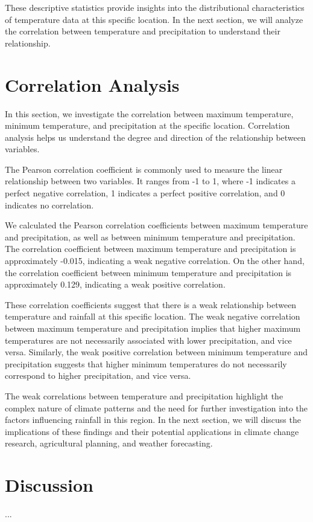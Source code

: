 \documentclass{article}
\begin{document}
These descriptive statistics provide insights into the distributional characteristics of temperature data at this specific location. In the next section, we will analyze the correlation between temperature and precipitation to understand their relationship.

\section{Correlation Analysis}
In this section, we investigate the correlation between maximum temperature, minimum temperature, and precipitation at the specific location. Correlation analysis helps us understand the degree and direction of the relationship between variables.

The Pearson correlation coefficient is commonly used to measure the linear relationship between two variables. It ranges from -1 to 1, where -1 indicates a perfect negative correlation, 1 indicates a perfect positive correlation, and 0 indicates no correlation.

We calculated the Pearson correlation coefficients between maximum temperature and precipitation, as well as between minimum temperature and precipitation. The correlation coefficient between maximum temperature and precipitation is approximately -0.015, indicating a weak negative correlation. On the other hand, the correlation coefficient between minimum temperature and precipitation is approximately 0.129, indicating a weak positive correlation.

These correlation coefficients suggest that there is a weak relationship between temperature and rainfall at this specific location. The weak negative correlation between maximum temperature and precipitation implies that higher maximum temperatures are not necessarily associated with lower precipitation, and vice versa. Similarly, the weak positive correlation between minimum temperature and precipitation suggests that higher minimum temperatures do not necessarily correspond to higher precipitation, and vice versa.

The weak correlations between temperature and precipitation highlight the complex nature of climate patterns and the need for further investigation into the factors influencing rainfall in this region. In the next section, we will discuss the implications of these findings and their potential applications in climate change research, agricultural planning, and weather forecasting.

\section{Discussion}
...
\end{document}
